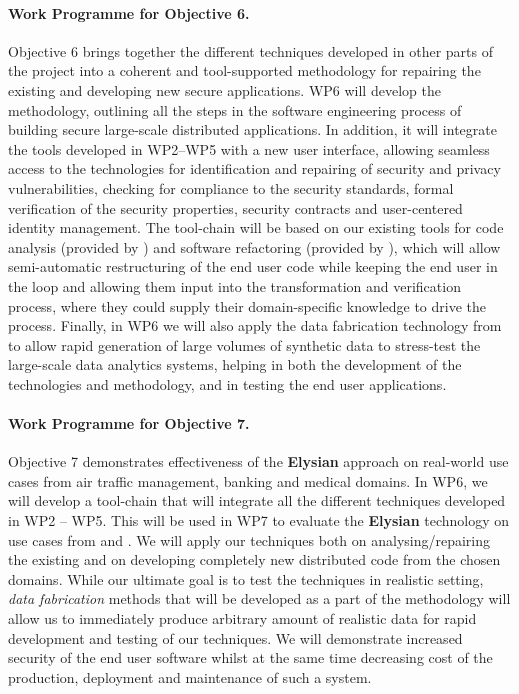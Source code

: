 \documentclass[a4paper,11pt]{article}
\newcommand{\project}[1]{\textbf{#1}\xspace}
\newcommand{\SECURITY}{\project{Elysian}}
\newcommand{\TheProject}{\SECURITY}
\begin{document}
\paragraph{Work Programme for Objective 6.} 

Objective 6  brings together the different techniques developed in other parts of the project into a coherent and tool-supported methodology for repairing the existing and developing new secure applications. WP6 will develop the methodology, outlining all the steps in the software engineering process of building secure large-scale distributed applications. In addition, it will integrate the tools developed in WP2--WP5 with a new user interface, allowing seamless access to the technologies for identification and repairing of security and privacy vulnerabilities, checking for compliance to the security standards, formal verification of the security properties, security contracts and user-centered identity management. The tool-chain will be based on our existing tools for code analysis (provided by \YAGshort{}) and software refactoring (provided by \SAshort{}), which will allow semi-automatic restructuring of the end user code while keeping the end user in the loop and allowing them input into the transformation and verification process, where they could supply their domain-specific knowledge to drive the process. Finally, in WP6 we will also apply the data fabrication technology from \IBMshort{} to allow rapid generation of large volumes of synthetic data to stress-test the large-scale data analytics systems, helping in both the development of the technologies and methodology, and in testing the end user applications.

\paragraph{Work Programme for Objective 7.} 

Objective 7 demonstrates effectiveness of the \TheProject{} approach on real-world use cases from air traffic management, %
banking and medical domains. In WP6, we will develop a tool-chain that will integrate all the different techniques developed in WP2 -- WP5. This will be used in WP7 to evaluate the \TheProject{} technology  on use cases from \SOPRAshort{} and \FRQshort{}. We will apply our techniques both on analysing/repairing the existing and on developing completely new distributed code from the chosen domains. While our ultimate goal is to test the techniques in realistic setting, \emph{data fabrication} methods that will be developed as a part of the methodology will allow us to immediately produce arbitrary amount of realistic data for rapid development and testing of our techniques. We will demonstrate increased security of the end user software whilst at the same time decreasing cost of the production, deployment and maintenance of such a system.
\end{document}
